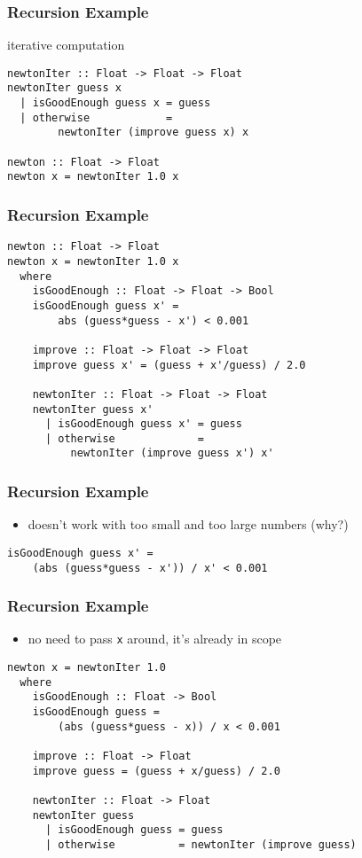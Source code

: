 \documentclass[dvipsnames]{beamer}
\theoremstyle{plain}
\begin{document}
\begin{frame}[fragile]
  \frametitle{Recursion Example}

  \begin{exampleblock}{iterative computation}
    \begin{lstlisting}
newtonIter :: Float -> Float -> Float
newtonIter guess x
  | isGoodEnough guess x = guess
  | otherwise            =
        newtonIter (improve guess x) x

newton :: Float -> Float
newton x = newtonIter 1.0 x
    \end{lstlisting}
  \end{exampleblock}
\end{frame}

\begin{frame}[fragile]
  \frametitle{Recursion Example}

  \begin{lstlisting}
newton :: Float -> Float
newton x = newtonIter 1.0 x
  where
    isGoodEnough :: Float -> Float -> Bool
    isGoodEnough guess x' =
        abs (guess*guess - x') < 0.001

    improve :: Float -> Float -> Float
    improve guess x' = (guess + x'/guess) / 2.0

    newtonIter :: Float -> Float -> Float
    newtonIter guess x'
      | isGoodEnough guess x' = guess
      | otherwise             =
          newtonIter (improve guess x') x'
  \end{lstlisting}
\end{frame}

\begin{frame}[fragile]
  \frametitle{Recursion Example}

  \begin{itemize}
    \item doesn't work with too small and too large numbers (why?)
  \end{itemize}

  \pause
  \smallskip
  \begin{lstlisting}
isGoodEnough guess x' =
    (abs (guess*guess - x')) / x' < 0.001
  \end{lstlisting}
\end{frame}

\begin{frame}[fragile]
  \frametitle{Recursion Example}

  \begin{itemize}
    \item no need to pass \lstinline{x} around, it's already in scope
  \end{itemize}

  \pause
  \smallskip
  \begin{lstlisting}
newton x = newtonIter 1.0
  where
    isGoodEnough :: Float -> Bool
    isGoodEnough guess =
        (abs (guess*guess - x)) / x < 0.001

    improve :: Float -> Float
    improve guess = (guess + x/guess) / 2.0

    newtonIter :: Float -> Float
    newtonIter guess
      | isGoodEnough guess = guess
      | otherwise          = newtonIter (improve guess)
  \end{lstlisting}
\end{frame}
\end{document}
